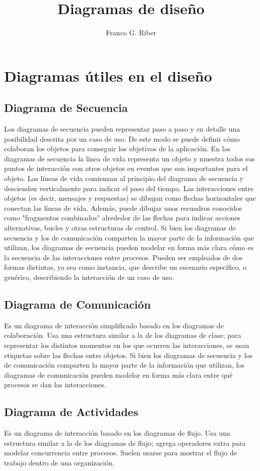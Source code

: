\documentclass[10pt,titlepage]{article}
\title{Diagramas de diseño}
\author{Franco G. Riber}
\begin{document}
\section*{Diagramas útiles en el diseño}

\subsection*{Diagrama de Secuencia}
Los diagramas de secuencia pueden representar paso a paso y en detalle una posibilidad descrita por un caso de uso. De este modo se puede definir cómo colaboran los objetos para conseguir los objetivos de la aplicación.
En los diagramas de secuencia la línea de vida representa un objeto y muestra todos sus puntos de interacción con otros objetos en eventos que son importantes para el objeto. Las líneas de vida comienzan al principio del diagrama de secuencia y descienden verticalmente para indicar el paso del tiempo. Las interacciones entre objetos (es decir, mensajes y respuestas) se dibujan como flechas horizontales que conectan las líneas de vida. Además, puede dibujar unos recuadros conocidos como "fragmentos combinados" alrededor de las flechas para indicar acciones alternativas, bucles y otras estructuras de control.
Si bien los diagramas de secuencia y los de comunicación comparten la mayor parte de la información que utilizan, los diagramas de secuencia pueden modelar en forma más clara cómo es la secuencia de las interacciones entre procesos.
Pueden ser empleados de dos formas distintas, ya sea como instancia, que describe un escenario específico, o genérico, describiendo la interacción de un caso de uso.

\subsection*{Diagrama de Comunicación}
Es un diagrama de interacción simplificado basado en los diagramas de colaboración.
Usa una estructura similar a la de los diagramas de clase; para representar los distintos momentos en los que ocurren las interacciones, se usan etiquetas sobre las flechas entre objetos.
Si bien los diagramas de secuencia y los de comunicación comparten la mayor parte de la información que utilizan, los diagramas de comunicación pueden modelar en forma más clara entre qué procesos se dan las interacciones.

\subsection*{Diagrama de Actividades}
Es un diagrama de interacción basado en los diagramas de flujo.
Usa una estructura similar a la de los diagramas de flujo; agrega operadores extra para modelar concurrencia entre procesos.
Suelen usarse para mostrar el flujo de trabajo dentro de una organización.
\end{document}
